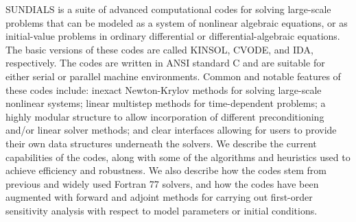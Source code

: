 SUNDIALS is a suite of advanced computational codes for solving
large-scale problems that can be modeled as a system of nonlinear
algebraic equations, or as initial-value problems in ordinary
differential or differential-algebraic equations. The basic versions
of these codes are called KINSOL, CVODE, and IDA, respectively. The
codes are written in ANSI standard C and are suitable for either serial
or parallel machine environments.  Common and notable features of
these codes include: inexact Newton-Krylov methods for solving
large-scale nonlinear systems; linear multistep methods for
time-dependent problems; a highly modular structure to allow
incorporation of different preconditioning and/or linear solver
methods; and clear interfaces allowing for users to provide their 
own data structures underneath the solvers.  We
describe the current capabilities of the codes, along with some of the
algorithms and heuristics used to achieve efficiency and robustness.
We also describe how the codes stem from previous and widely used
Fortran 77 solvers, and how the codes have been augmented with forward
and adjoint methods for carrying out first-order sensitivity analysis
with respect to model parameters or initial conditions.
